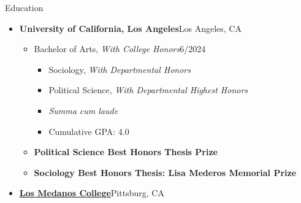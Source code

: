 \documentclass[12pt]{resume} %
\begin{document}
\begin{rSection}{Education}
\begin{itemize}[leftmargin=0em, itemsep=0pt]
\item[] \textbf{University of California, Los Angeles}\hfill{}Los Angeles, CA
\begin{itemize}[leftmargin=1em, itemsep=0pt]
    \item[] Bachelor of Arts, \textit{With College Honors}\hfill{}6/2024
    \begin{itemize}[leftmargin=1em, itemsep=0pt]
        \item[] Sociology, \textit{With Departmental Honors}
        \item[] Political Science, \textit{With Departmental Highest Honors}
    \item[] \textit{Summa cum laude}
    \item[] Cumulative GPA: 4.0
    \end{itemize}
    \vspace{6pt}
\item[] \textbf{Political Science Best Honors Thesis Prize}
\vspace{6pt}
\item[] \textbf{Sociology Best Honors Thesis: Lisa Mederos Memorial Prize}
\end{itemize}
\vspace{12pt}
\item[] \textbf{\href{https://www.losmedanos.edu/}{Los Medanos College}}\hfill{}Pittsburg, CA

\end{itemize}
\end{rSection}
\end{document}
